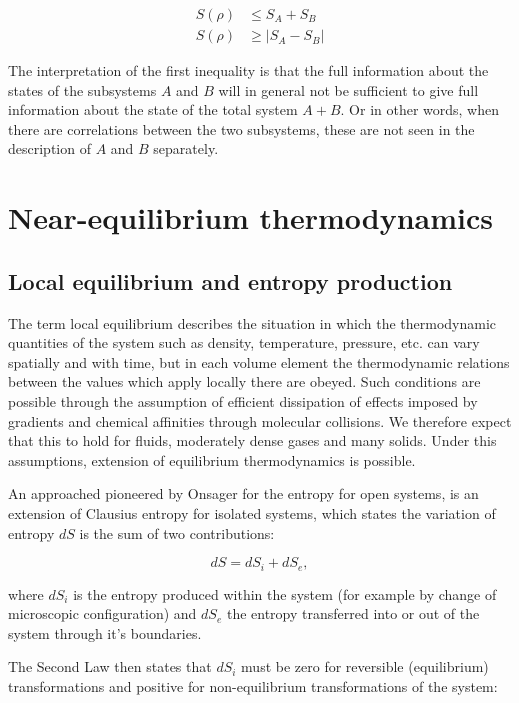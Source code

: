 \documentclass[a4paper,12pt]{article}
\begin{document}
\begin{equation}
\begin{aligned}
	S(\rho) &\leq S_A + S_B	\\
	S(\rho) &\geq \left| S_A - S_B \right|
\end{aligned}
\end{equation}

The interpretation of the first inequality is that the full information about the states of the subsystems $A$ and $B$ will in general not be sufficient to give full information about the state of the total system $A+B$. Or in other words, when there are correlations between the two subsystems, these are not seen in the description of $A$ and $B$ separately. 

\section{Near-equilibrium thermodynamics}
\subsection{Local equilibrium and entropy production}

The term local equilibrium describes the situation in which the thermodynamic quantities of the system such as density, temperature, pressure, etc. can vary spatially and with time, but in each volume element the thermodynamic relations between the values which apply locally there are obeyed. 
Such conditions are possible through the assumption of efficient dissipation of effects imposed by gradients and chemical affinities through molecular collisions. We therefore expect that this to hold for fluids, moderately dense gases and many solids.
Under this assumptions, extension of equilibrium thermodynamics is possible\cite{Anonymous:NJxQY1gt}.

An approached pioneered by Onsager for the entropy for open systems, is an extension of Clausius entropy for isolated systems, which states the variation of entropy $dS$ is the sum of two contributions: 

\begin{equation}
  	dS=dS_i+dS_e,
\end{equation}

where $dS_i$ is the entropy produced within the system (for example by change of microscopic configuration) and $dS_e$ the entropy transferred into or out of the system through it's boundaries.

The Second Law then states that $dS_i$ must be zero for reversible (equilibrium) transformations and positive for non-equilibrium transformations of the system\cite{DeGroot:2013ue}:
\end{document}
